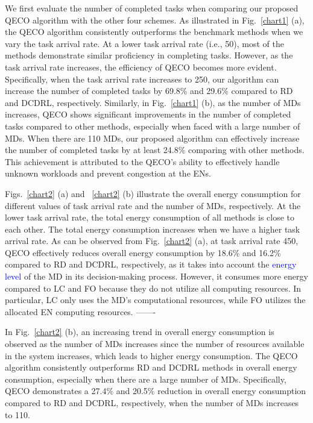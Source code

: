\documentclass[12pt,draftclsnofoot,onecolumn]{IEEEtran}
\begin{document}
We first evaluate the number of completed tasks when comparing our proposed QECO algorithm with the other four schemes. As illustrated in Fig.~\ref{chart1} (a), the QECO algorithm consistently outperforms the benchmark methods when we vary the task arrival rate. At a lower task arrival rate (i.e., 50), most of the methods demonstrate similar proficiency in completing tasks. However, as the task arrival rate increases, the efficiency of QECO becomes more evident. Specifically, when the task arrival rate increases to 250, our algorithm can increase the number of completed tasks by 69.8\% and 29.6\% compared to RD and DCDRL, respectively.
Similarly, in Fig.~\ref{chart1} (b), as the number of MDs increases, QECO shows significant improvements in the number of completed tasks compared to other methods, especially when faced with a large number of MDs. When there are 110 MDs, our proposed algorithm can effectively increase the number of completed tasks by at least 24.8\% comparing with other methods. This achievement is attributed to the QECO's ability to effectively handle unknown workloads and prevent congestion at the ENs.

Figs.~\ref{chart2} (a) and ~\ref{chart2} (b) illustrate the overall energy consumption for different values of task arrival rate and the number of MDs, respectively. At the lower task arrival rate, the total energy consumption of all methods is close to each other. The total energy consumption increases when we have a higher task arrival rate.  
As can be observed from Fig.~\ref{chart2} (a), at task arrival rate 450, QECO effectively reduces overall energy consumption by 18.6\% and 16.2\% compared to RD and DCDRL, respectively, as it takes into account the \textcolor{blue}{energy level} of the MD in its decision-making process. However, it consumes more energy compared to LC and FO because they do not utilize all computing resources. In particular, LC only uses the MD's computational resources, while FO utilizes the allocated EN computing resources. -------






In Fig.~\ref{chart2} (b), an increasing trend in overall energy consumption is observed as the number of MDs increases since the number of resources available in the system increases, which leads to higher energy consumption. The QECO algorithm consistently outperforms RD and DCDRL methods in overall energy consumption, especially when there are a large number of MDs. Specifically, QECO demonstrates a 27.4\% and 20.5\% reduction in overall energy consumption compared to RD and DCDRL, respectively, when the number of MDs increases to 110.
\end{document}
